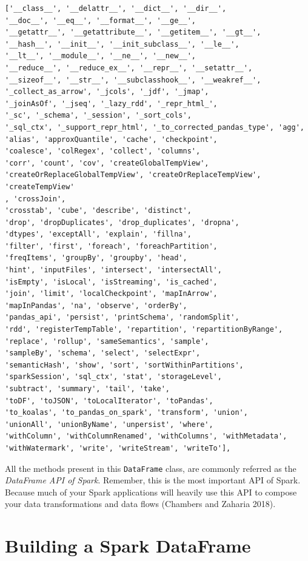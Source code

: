 \documentclass[
  11pt,
  letterpaper,
  DIV=11,
  numbers=noendperiod]{scrreprt}
\begin{document}
\begin{verbatim}
['__class__', '__delattr__', '__dict__', '__dir__',
'__doc__', '__eq__', '__format__', '__ge__',
'__getattr__', '__getattribute__', '__getitem__', '__gt__',
'__hash__', '__init__', '__init_subclass__', '__le__',
'__lt__', '__module__', '__ne__', '__new__',
'__reduce__', '__reduce_ex__', '__repr__', '__setattr__',
'__sizeof__', '__str__', '__subclasshook__', '__weakref__',
'_collect_as_arrow', '_jcols', '_jdf', '_jmap',
'_joinAsOf', '_jseq', '_lazy_rdd', '_repr_html_',
'_sc', '_schema', '_session', '_sort_cols',
'_sql_ctx', '_support_repr_html', '_to_corrected_pandas_type', 'agg',
'alias', 'approxQuantile', 'cache', 'checkpoint',
'coalesce', 'colRegex', 'collect', 'columns',
'corr', 'count', 'cov', 'createGlobalTempView',
'createOrReplaceGlobalTempView', 'createOrReplaceTempView', 'createTempView'
, 'crossJoin',
'crosstab', 'cube', 'describe', 'distinct',
'drop', 'dropDuplicates', 'drop_duplicates', 'dropna',
'dtypes', 'exceptAll', 'explain', 'fillna',
'filter', 'first', 'foreach', 'foreachPartition',
'freqItems', 'groupBy', 'groupby', 'head',
'hint', 'inputFiles', 'intersect', 'intersectAll',
'isEmpty', 'isLocal', 'isStreaming', 'is_cached',
'join', 'limit', 'localCheckpoint', 'mapInArrow',
'mapInPandas', 'na', 'observe', 'orderBy',
'pandas_api', 'persist', 'printSchema', 'randomSplit',
'rdd', 'registerTempTable', 'repartition', 'repartitionByRange',
'replace', 'rollup', 'sameSemantics', 'sample',
'sampleBy', 'schema', 'select', 'selectExpr',
'semanticHash', 'show', 'sort', 'sortWithinPartitions',
'sparkSession', 'sql_ctx', 'stat', 'storageLevel',
'subtract', 'summary', 'tail', 'take',
'toDF', 'toJSON', 'toLocalIterator', 'toPandas',
'to_koalas', 'to_pandas_on_spark', 'transform', 'union',
'unionAll', 'unionByName', 'unpersist', 'where',
'withColumn', 'withColumnRenamed', 'withColumns', 'withMetadata',
'withWatermark', 'write', 'writeStream', 'writeTo'],
\end{verbatim}

All the methods present in this \texttt{DataFrame} class, are commonly
referred as the \emph{DataFrame API of Spark}. Remember, this is the
most important API of Spark. Because much of your Spark applications
will heavily use this API to compose your data transformations and data
flows (Chambers and Zaharia 2018).

\hypertarget{sec-building-a-dataframe}{%
\section{Building a Spark DataFrame}\label{sec-building-a-dataframe}}
\end{document}
